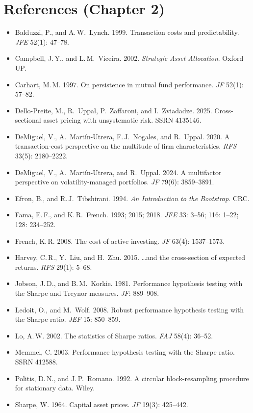 \documentclass[11pt,a4paper]{report}
\begin{document}
\section*{References (Chapter 2)}
\begin{itemize}[leftmargin=*]
\small
\item Balduzzi, P., and A.\,W.~Lynch. 1999. Transaction costs and predictability. \emph{JFE} 52(1): 47--78.
\item Campbell, J.\,Y., and L.\,M.~Viceira. 2002. \emph{Strategic Asset Allocation}. Oxford UP.
\item Carhart, M.\,M. 1997. On persistence in mutual fund performance. \emph{JF} 52(1): 57--82.
\item Dello-Preite, M., R.~Uppal, P.~Zaffaroni, and I.~Zviadadze. 2025. Cross-sectional asset pricing with unsystematic risk. SSRN 4135146.
\item DeMiguel, V., A.~Mart\'in-Utrera, F.\,J.~Nogales, and R.~Uppal. 2020. A transaction-cost perspective on the multitude of firm characteristics. \emph{RFS} 33(5): 2180--2222.
\item DeMiguel, V., A.~Mart\'in-Utrera, and R.~Uppal. 2024. A multifactor perspective on volatility-managed portfolios. \emph{JF} 79(6): 3859--3891.
\item Efron, B., and R.\,J.~Tibshirani. 1994. \emph{An Introduction to the Bootstrap}. CRC.
\item Fama, E.\,F., and K.\,R.~French. 1993; 2015; 2018. \emph{JFE} 33: 3--56; 116: 1--22; 128: 234--252.
\item French, K.\,R. 2008. The cost of active investing. \emph{JF} 63(4): 1537--1573.
\item Harvey, C.\,R., Y.~Liu, and H.~Zhu. 2015. \dots and the cross-section of expected returns. \emph{RFS} 29(1): 5--68.
\item Jobson, J.\,D., and B.\,M.~Korkie. 1981. Performance hypothesis testing with the Sharpe and Treynor measures. \emph{JF}: 889--908.
\item Ledoit, O., and M.~Wolf. 2008. Robust performance hypothesis testing with the Sharpe ratio. \emph{JEF} 15: 850--859.
\item Lo, A.\,W. 2002. The statistics of Sharpe ratios. \emph{FAJ} 58(4): 36--52.
\item Memmel, C. 2003. Performance hypothesis testing with the Sharpe ratio. SSRN 412588.
\item Politis, D.\,N., and J.\,P.~Romano. 1992. A circular block-resampling procedure for stationary data. Wiley.
\item Sharpe, W. 1964. Capital asset prices. \emph{JF} 19(3): 425--442.
\end{itemize}
\end{document}
